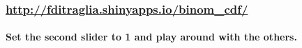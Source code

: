\begin{frame}
	\frametitle{\href{http://fditraglia.shinyapps.io/binom_cdf/}{http://fditraglia.shinyapps.io/binom\_cdf/}}
\framesubtitle{Set the second slider to 1 and play around with the others.}

\begin{figure}
\end{figure}

\end{frame}


